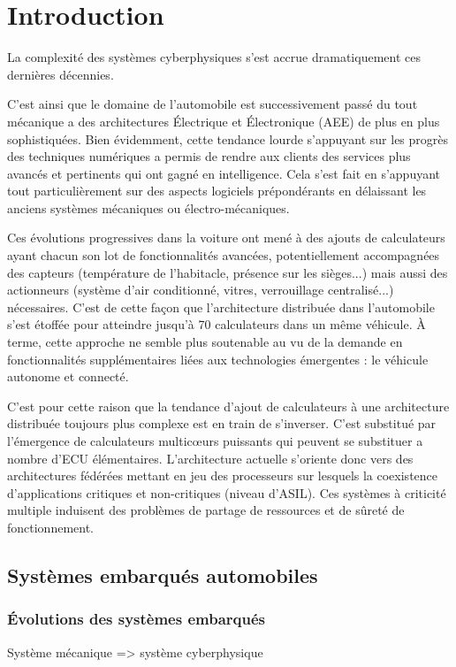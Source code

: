 \documentclass[french, a4paper, 11pt, twoside, pdftex]{StyleThese}
\begin{document}
\fi


\chapter*{Introduction}

La complexité des systèmes cyberphysiques s’est accrue dramatiquement  ces dernières décennies. 

C'est ainsi que le domaine de l'automobile est successivement passé du tout mécanique a des architectures Électrique et Électronique (AEE) de plus en plus sophistiquées. Bien évidemment, cette tendance lourde s’appuyant sur les progrès des techniques numériques a permis de rendre aux clients des services plus avancés et pertinents qui ont gagné en intelligence. Cela s'est fait en s’appuyant tout particulièrement sur des aspects logiciels prépondérants en délaissant les anciens systèmes mécaniques ou électro-mécaniques.

Ces évolutions progressives dans la voiture ont mené à des ajouts de calculateurs ayant chacun son lot de fonctionnalités avancées, potentiellement accompagnées des capteurs (température de l'habitacle, présence sur les sièges...) mais aussi des actionneurs (système d'air conditionné, vitres, verrouillage centralisé...) nécessaires.
C'est de cette façon que l'architecture distribuée dans l'automobile s'est étoffée pour atteindre jusqu'à 70 calculateurs dans un même véhicule. À terme, cette approche ne semble plus soutenable au vu de la demande en fonctionnalités supplémentaires liées aux technologies émergentes : le véhicule autonome et connecté.

C’est pour cette raison que la tendance d'ajout de calculateurs à une architecture distribuée toujours plus complexe est en train de s’inverser. C'est substitué par l’émergence de calculateurs multicœurs puissants qui peuvent se substituer a nombre d’ECU élémentaires. L’architecture actuelle s’oriente donc vers des architectures fédérées mettant en jeu des processeurs sur lesquels la coexistence d’applications critiques et non-critiques (niveau d’ASIL). Ces systèmes à criticité multiple  induisent des problèmes de partage de ressources et de sûreté de fonctionnement.

\section*{Systèmes embarqués automobiles}
    \subsection*{Évolutions des systèmes embarqués}
        Système mécanique => système cyberphysique
\end{document}
